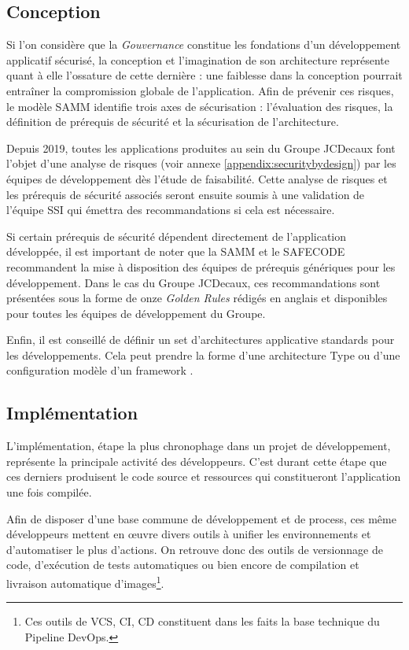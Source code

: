 \subsection{Conception}

Si l'on considère que la \emph{Gouvernance} constitue les fondations d'un développement applicatif sécurisé, la 
conception et l'imagination de son architecture représente quant à elle l'ossature de cette dernière : une faiblesse dans 
la conception pourrait entraîner la compromission globale de l'application. 
\newline Afin de prévenir ces risques, le modèle \ac{SAMM} identifie trois axes de sécurisation : l'évaluation des risques, 
la définition de prérequis de sécurité et la sécurisation de l'architecture.

Depuis 2019, toutes les applications produites au sein du Groupe JCDecaux font l'objet d'une analyse de risques 
(voir annexe \ref{appendix:securitybydesign}) par les équipes de développement dès l'étude de faisabilité. 
Cette analyse de risques et les prérequis de sécurité associés seront ensuite soumis à une validation de l'équipe \ac{SSI} 
qui émettra des recommandations si cela est nécessaire.

Si certain prérequis de sécurité  dépendent directement de l'application développée, il est important 
de noter que la \ac{SAMM} et le \ac{SAFECODE}\autocite[p. 15]{fundamental_pract_sec_soft_safecode_2018} recommandent la 
mise à disposition des équipes de prérequis génériques pour les développement.
\newline Dans le cas du Groupe JCDecaux, ces recommandations sont présentées sous la forme de onze \emph{Golden Rules}
rédigés en anglais et disponibles pour toutes les équipes de développement du Groupe.

Enfin, il est conseillé de définir un set d'architectures applicative standards pour les développements. Cela peut prendre la 
forme d'une architecture Type ou d'une configuration modèle d'un framework .

\subsection{Implémentation}
L'implémentation, étape la plus chronophage dans un projet de développement, représente la principale activité des 
développeurs. C'est durant cette étape que ces derniers produisent le code source et ressources qui constitueront
l'application une fois compilée.

Afin de disposer d'une base commune de développement et de process, ces même développeurs mettent en œuvre divers outils
à unifier les environnements et d'automatiser le plus d'actions. On retrouve donc des outils de versionnage de code, 
d'exécution de tests automatiques ou bien encore de compilation et livraison automatique d'images\footnote{Ces outils de \ac{VCS}, 
\ac{CI}, \ac{CD} constituent dans les faits la base technique du Pipeline DevOps.}.

